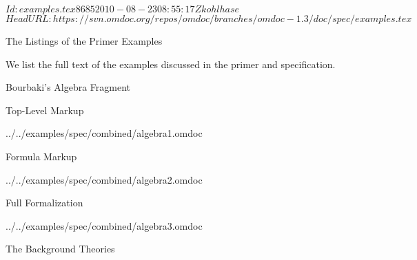 \svnInfo $Id: examples.tex 8685 2010-08-23 08:55:17Z kohlhase $
\svnKeyword $HeadURL: https://svn.omdoc.org/repos/omdoc/branches/omdoc-1.3/doc/spec/examples.tex $

\begin{tchapter}[id=examples]{The Listings of the Primer Examples}

We list the full text of the examples discussed in the {\omdoc} primer and
specification. 

\begin{tsection}[id=examples:algebra]{Bourbaki's Algebra  Fragment}

\begin{tsubsection}[id=examples:algebra1]{Top-Level Markup}


  {../../examples/spec/combined/algebra1.omdoc}
\end{tsubsection}

\begin{tsubsection}[id=examples:algebra2]{Formula Markup}


  {../../examples/spec/combined/algebra2.omdoc}
\end{tsubsection}

\begin{tsubsection}[id=examples:algebra3]{Full Formalization}


  {../../examples/spec/combined/algebra3.omdoc}
\end{tsubsection}

\begin{tsubsection}[id=examples:background]{The Background Theories}


\end{tsubsection}
\end{tsection}
\end{tchapter}

